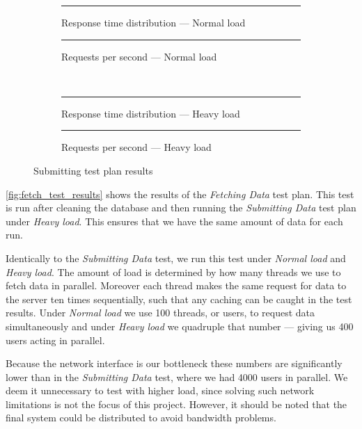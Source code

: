 \begin{figure}[!htb]
    \centering
    \begin{subfigure}[b]{0.5\textwidth}
        \centering
        \rule{5cm}{5cm}
        \caption{Response time distribution --- Normal load}\label{fig:submit_resp_t_dist}
    \end{subfigure}\hfill%
    \begin{subfigure}[b]{0.5\textwidth}
        \centering
        \rule{5cm}{5cm}
        \caption{Requests per second --- Normal load}\label{fig:submit_reqs_p_sec}
    \end{subfigure}\\
    \begin{subfigure}[b]{0.5\textwidth}
        \centering
        \rule{5cm}{5cm}
        \caption{Response time distribution --- Heavy load}\label{fig:submit_resp_t_dist_heavy}
    \end{subfigure}\hfill%
    \begin{subfigure}[b]{0.5\textwidth}
        \centering
        \rule{5cm}{5cm}
        \caption{Requests per second --- Heavy load}\label{fig:submit_reqs_p_sec_heavy}
    \end{subfigure}
    \caption{Submitting test plan results}\label{fig:submit_test_results}
\end{figure}

\bigskip
\cref{fig:fetch_test_results} shows the results of the \textit{Fetching Data} test plan.
This test is run after cleaning the database and then running the \textit{Submitting Data} test plan under \textit{Heavy load}.
This ensures that we have the same amount of data for each run.

Identically to the \textit{Submitting Data} test, we run this test under \textit{Normal load} and \textit{Heavy load}.
The amount of load is determined by how many threads we use to fetch data in parallel.
Moreover each thread makes the same request for data to the server ten times sequentially, such that any caching can be caught in the test results.
Under \textit{Normal load} we use 100 threads, or users, to request data simultaneously and under \textit{Heavy load} we quadruple that number --- giving us 400 users acting in parallel.

Because the network interface is our bottleneck these numbers are significantly lower than in the \textit{Submitting Data} test, where we had 4000 users in parallel.
We deem it unnecessary to test with higher load, since solving such network limitations is not the focus of this project.
However, it should be noted that the final system could be distributed to avoid bandwidth problems.

